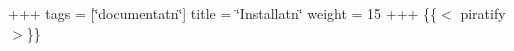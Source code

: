 +++ tags = \mbox{[}\char`\"{}documentat\textquotesingle{}n\char`\"{}\mbox{]} title = \char`\"{}\+Installat\textquotesingle{}n\char`\"{} weight = 15 +++ \{\{$<$ piratify $>$\}\} 